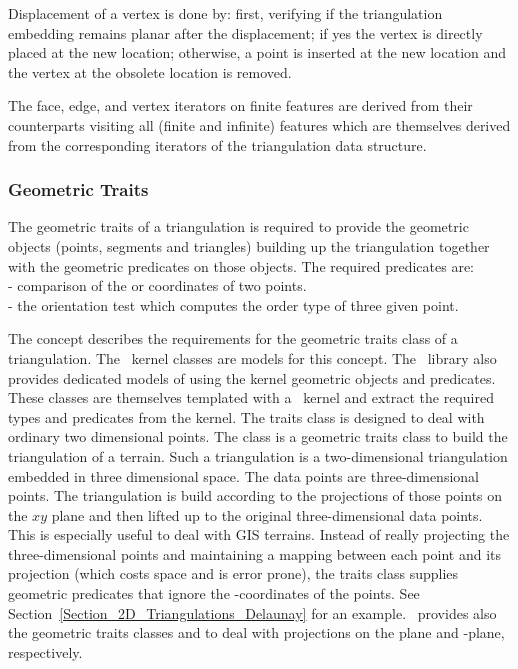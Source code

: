 Displacement of a vertex is done by: first, verifying if the triangulation embedding
remains planar after the displacement; if yes the vertex is directly placed at the new location; otherwise, a point is inserted at the new location 
and the vertex at the obsolete location is removed.

The face, edge, and vertex iterators on finite features
are derived from their counterparts visiting all (finite and infinite)
features which are themselves derived from the corresponding iterators
of the triangulation data structure.


\subsubsection{Geometric Traits\label{Subsubsection_2D_Triangulation_Basic_Geometric_Traits}}

The geometric traits of a triangulation 
 is required to provide
the geometric objects (points, segments and triangles)
building up the triangulation
together with the geometric predicates on those objects.
The required predicates are: \\
- comparison of the  or  coordinates of two points.\\
- the orientation test which computes 
  the order type of three given point.

The concept
  describes the requirements for the 
geometric traits class of a triangulation.
 The \cgal\  kernel classes 
are models for  this  concept.
The \cgal\  library also provides dedicated models
of  
using the kernel geometric objects and predicates.
These classes are themselves templated with a \cgal\  kernel
and extract the required types and predicates from the kernel.
The traits class 
is designed to deal with ordinary  two dimensional points.
The class  
is a geometric traits class to build the triangulation
of a terrain. Such a triangulation is a two-dimensional
triangulation embedded  in  three dimensional space.
The data points are three-dimensional points.
The triangulation is 
build according to  the projections of those points
on the $xy$ plane  and then lifted up to the original
three-dimensional data points.
This is especially useful
to deal with GIS terrains.
Instead of really projecting the  three-dimensional points and
maintaining a mapping between each point and its projection
 (which costs space and is error prone),
the traits class  supplies geometric predicates that ignore the
-coordinates of the points.
See Section~\ref{Section_2D_Triangulations_Delaunay} for an example.
\cgal\ provides also the geometric traits classes
 and
 to
deal with projections on the
  plane  and  -plane,
respectively.


